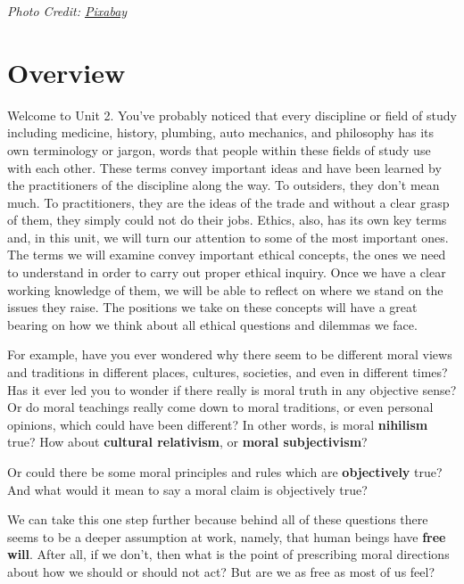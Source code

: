 \documentclass[
]{book}
\begin{document}
\emph{Photo Credit: \href{https://pixabay.com/en/ethicsrightwrongethicalmoral2991600/}{Pixabay}}

\hypertarget{overview-1}{%
\section*{Overview}\label{overview-1}}

Welcome to Unit 2. You've probably noticed that every discipline or field of study including medicine, history, plumbing, auto mechanics, and philosophy has its own terminology or jargon, words that people within these fields of study use with each other. These terms convey important ideas and have been learned by the practitioners of the discipline along the way. To outsiders, they don't mean much. To practitioners, they are the ideas of the trade and without a clear grasp of them, they simply could not do their jobs. Ethics, also, has its own key terms and, in this unit, we will turn our attention to some of the most important ones. The terms we will examine convey important ethical concepts, the ones we need to understand in order to carry out proper ethical inquiry. Once we have a clear working knowledge of them, we will be able to reflect on where we stand on the issues they raise. The positions we take on these concepts will have a great bearing on how we think about all ethical questions and dilemmas we face.

For example, have you ever wondered why there seem to be different moral views
and traditions in different places, cultures, societies, and even in different
times? Has it ever led you to wonder if there really is moral truth in any
objective sense? Or do moral teachings really come down to moral traditions, or
even personal opinions, which could have been different? In other words, is
moral \textbf{nihilism} true? How about \textbf{cultural relativism}, or \textbf{moral
subjectivism}?

Or could there be some moral principles and rules which are \textbf{objectively}
true? And what would it mean to say a moral claim is objectively true?

We can take this one step further because behind all of these questions there
seems to be a deeper assumption at work, namely, that human beings have \textbf{free
will}. After all, if we don't, then what is the point of prescribing moral
directions about how we should or should not act? But are we as free as most of
us feel?
\end{document}
